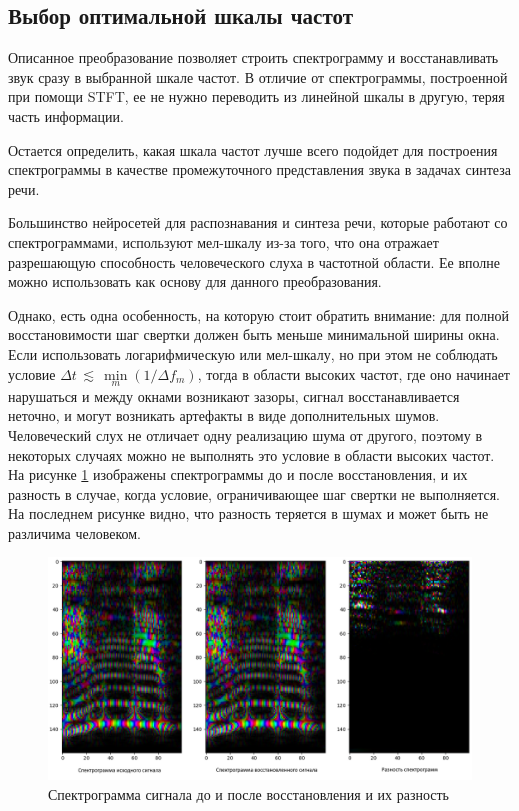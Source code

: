 \subsection{Выбор оптимальной шкалы частот}

Описанное преобразование позволяет строить спектрограмму и восстанавливать звук сразу в выбранной шкале частот. 
В отличие от спектрограммы, построенной при помощи STFT, 
ее не нужно переводить из линейной шкалы в другую, теряя часть информации. 

Остается определить, какая шкала частот лучше всего подойдет для построения спектрограммы 
в качестве промежуточного представления звука в задачах синтеза речи.

Большинство нейросетей для распознавания и синтеза речи, которые работают со спектрограммами, используют мел-шкалу из-за того, что она отражает
разрешающую способность человеческого слуха в частотной области. Ее вполне можно использовать как основу для данного преобразования.

Однако, есть одна особенность, на которую стоит обратить внимание: 
для полной восстановимости шаг свертки должен быть меньше минимальной ширины окна. 
Если использовать логарифмическую или мел-шкалу, но при этом не соблюдать условие $ \Delta t \, \lesssim \, \min \limits_m (1/\Delta f_m) $,
тогда в области высоких частот, где оно начинает нарушаться и между окнами возникают зазоры, сигнал восстанавливается неточно, 
и могут возникать артефакты в виде дополнительных шумов. Человеческий слух не отличает одну реализацию шума от другого, 
поэтому в некоторых случаях можно не выполнять это условие в области высоких частот.
На рисунке \ref{fig:spec_diff} изображены спектрограммы до и после восстановления, и их разность в случае, 
когда условие, ограничивающее шаг свертки не выполняется. На последнем рисунке видно, 
что разность теряется в шумах и может быть не различима человеком.

\begin{figure}[t]
  \centering
  \includegraphics[width=0.8\linewidth]{figures/spec_diff}
  \caption{Спектрограмма сигнала до и после восстановления и их разность}
  \label{fig:spec_diff}
\end{figure}

